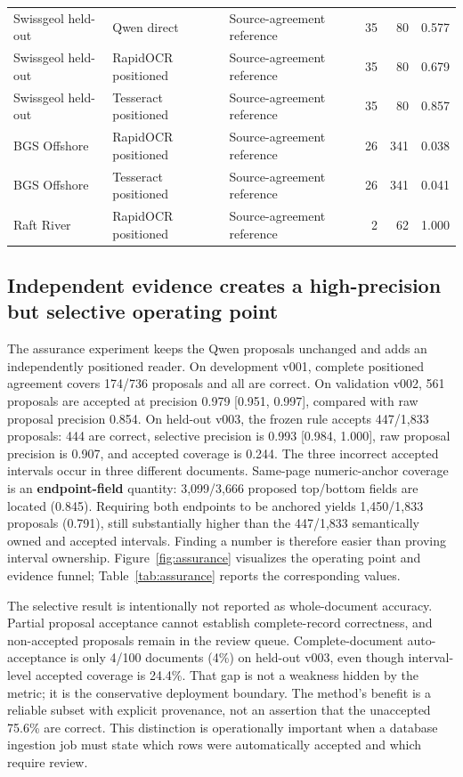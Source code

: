 \documentclass[a4paper,fleqn]{cas-sc}
\begin{document}
\begin{longtable}{@{}>{\raggedright\arraybackslash}p{}>{\raggedright\arraybackslash}p{}>{\raggedright\arraybackslash}p{}rrr@{}}
Swissgeol held-out & Qwen direct & Source-agreement reference & 35 & 80 & 0.577 \\
Swissgeol held-out & RapidOCR positioned & Source-agreement reference & 35 & 80 & 0.679 \\
Swissgeol held-out & Tesseract positioned & Source-agreement reference & 35 & 80 & 0.857 \\
BGS Offshore & RapidOCR positioned & Source-agreement reference & 26 & 341 & 0.038 \\
BGS Offshore & Tesseract positioned & Source-agreement reference & 26 & 341 & 0.041 \\
Raft River & RapidOCR positioned & Source-agreement reference & 2 & 62 & 1.000 \\
\end{longtable}
\endgroup


\subsection{Independent evidence creates a high-precision but selective operating point}

The assurance experiment keeps the Qwen proposals unchanged and adds an independently positioned reader. On development v001, complete positioned agreement covers 174/736 proposals and all are correct. On validation v002, 561 proposals are accepted at precision 0.979 {[}0.951, 0.997{]}, compared with raw proposal precision 0.854. On held-out v003, the frozen rule accepts 447/1,833 proposals: 444 are correct, selective precision is 0.993 {[}0.984, 1.000{]}, raw proposal precision is 0.907, and accepted coverage is 0.244. The three incorrect accepted intervals occur in three different documents. Same-page numeric-anchor coverage is an \textbf{endpoint-field} quantity: 3,099/3,666 proposed top/bottom fields are located (0.845). Requiring both endpoints to be anchored yields 1,450/1,833 proposals (0.791), still substantially higher than the 447/1,833 semantically owned and accepted intervals. Finding a number is therefore easier than proving interval ownership. Figure~\ref{fig:assurance} visualizes the operating point and evidence funnel; Table~\ref{tab:assurance} reports the corresponding values.

The selective result is intentionally not reported as whole-document accuracy. Partial proposal acceptance cannot establish complete-record correctness, and non-accepted proposals remain in the review queue. Complete-document auto-acceptance is only 4/100 documents (4\%) on held-out v003, even though interval-level accepted coverage is 24.4\%. That gap is not a weakness hidden by the metric; it is the conservative deployment boundary. The method's benefit is a reliable subset with explicit provenance, not an assertion that the unaccepted 75.6\% are correct. This distinction is operationally important when a database ingestion job must state which rows were automatically accepted and which require review.
\end{document}
